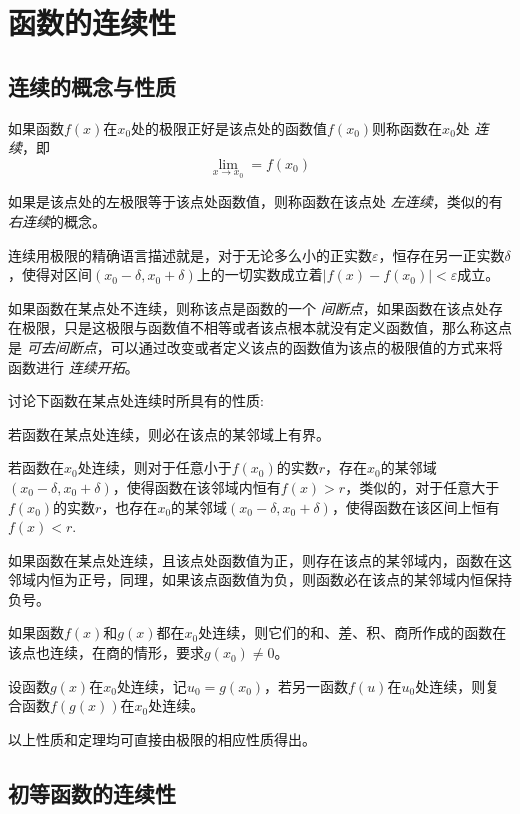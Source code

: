 
\section{函数的连续性}
\label{sec:the-continuity-of-function}

\subsection{连续的概念与性质}
\label{sec:the-concept-and-properties-of-continuity-function}

\begin{definition}
  如果函数$f(x)$在$x_0$处的极限正好是该点处的函数值$f(x_0)$则称函数在$x_0$处 \emph{连续}，即
  \[ \lim_{x \to x_0} = f(x_0) \]
\end{definition}

如果是该点处的左极限等于该点处函数值，则称函数在该点处 \emph{左连续}，类似的有 \emph{右连续}的概念。

连续用极限的精确语言描述就是，对于无论多么小的正实数$\varepsilon$，恒存在另一正实数$\delta$，使得对区间$(x_0-\delta, x_0+\delta)$上的一切实数成立着$|f(x)-f(x_0)|<\varepsilon$成立。

如果函数在某点处不连续，则称该点是函数的一个 \emph{间断点}，如果函数在该点处存在极限，只是这极限与函数值不相等或者该点根本就没有定义函数值，那么称这点是 \emph{可去间断点}，可以通过改变或者定义该点的函数值为该点的极限值的方式来将函数进行 \emph{连续开拓}。

讨论下函数在某点处连续时所具有的性质:
\begin{theorem}[局部有界性]
  若函数在某点处连续，则必在该点的某邻域上有界。
\end{theorem}

\begin{theorem}[局部保号性]
  若函数在$x_0$处连续，则对于任意小于$f(x_0)$的实数$r$，存在$x_0$的某邻域$(x_0-\delta,x_0+\delta)$，使得函数在该邻域内恒有$f(x)>r$，类似的，对于任意大于$f(x_0)$的实数$r$，也存在$x_0$的某邻域$(x_0-\delta,x_0+\delta)$，使得函数在该区间上恒有$f(x)<r$.
\end{theorem}

\begin{inference}
  如果函数在某点处连续，且该点处函数值为正，则存在该点的某邻域内，函数在这邻域内恒为正号，同理，如果该点函数值为负，则函数必在该点的某邻域内恒保持负号。
\end{inference}

\begin{theorem}
  如果函数$f(x)$和$g(x)$都在$x_0$处连续，则它们的和、差、积、商所作成的函数在该点也连续，在商的情形，要求$g(x_0) \neq 0$。
\end{theorem}

\begin{theorem}[复合函数的连续性]
  设函数$g(x)$在$x_0$处连续，记$u_0=g(x_0)$，若另一函数$f(u)$在$u_0$处连续，则复合函数$f(g(x))$在$x_0$处连续。
\end{theorem}

以上性质和定理均可直接由极限的相应性质得出。

\subsection{初等函数的连续性}
\label{sec:the-continuity-of-elementary-function}



